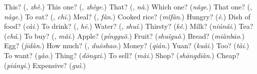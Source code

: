 \begin{tcolorbox}[breakable,colback=teal!4,colframe=teal!35!black,title={Before you move on}]
This? (\textbf{}, \emph{zhè}.) This one? (\textbf{}, \emph{zhège}.) That? (\textbf{}, \emph{nà}.) Which one? (\emph{nǎge}.) That one? (\textbf{}, \emph{nàge}.) To eat? (\textbf{}, \emph{chī}.) Meal? (\textbf{}, \emph{fàn}.) Cooked rice? (\emph{mǐfàn}.) Hungry? (\emph{è}.) Dish of food? (\emph{cài}.) To drink? (\textbf{}, \emph{hē}.) Water? (\textbf{}, \emph{shuǐ}.) Thirsty? (\emph{kě}.) Milk? (\emph{niúnǎi}.) Tea? (\emph{chá}.) To buy? (\textbf{}, \emph{mǎi}.) Apple? (\emph{píngguǒ}.) Fruit? (\emph{shuǐguǒ}.) Bread? (\emph{miànbāo}.) Egg? (\emph{jīdàn}.) How much? (\textbf{}, \emph{duōshao}.) Money? (\emph{qián}.) Yuan? (\emph{kuài}.) Too? (\emph{tài}.) To want? (\emph{yào}.) Thing? (\emph{dōngxi}.) To sell? (\emph{mài}.) Shop? (\emph{shāngdiàn}.) Cheap? (\emph{piányi}.) Expensive? (\emph{guì}.)
\end{tcolorbox}
